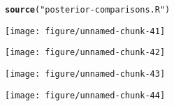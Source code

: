 \documentclass[12pt]{article}\usepackage[]{graphicx}\usepackage[]{color}
\makeatletter
\def\maxwidth{ %
  \ifdim\Gin@nat@width>\linewidth
    \linewidth
  \else
    \Gin@nat@width
  \fi
}
\newcommand{\hlstr}[1]{\textcolor[rgb]{0.192,0.494,0.8}{#1}}%
\newcommand{\hlstd}[1]{\textcolor[rgb]{0.345,0.345,0.345}{#1}}%
\newcommand{\hlkwd}[1]{\textcolor[rgb]{0.737,0.353,0.396}{\textbf{#1}}}%
\newenvironment{kframe}{%
 \def\at@end@of@kframe{}%
 \ifinner\ifhmode%
  \def\at@end@of@kframe{\end{minipage}}%
  \begin{minipage}{\columnwidth}%
 \fi\fi%
 \def\FrameCommand##1{\hskip\@totalleftmargin \hskip-\fboxsep
 \colorbox{shadecolor}{##1}\hskip-\fboxsep
     \hskip-\linewidth \hskip-\@totalleftmargin \hskip\columnwidth}%
 \MakeFramed {\advance\hsize-\width
   \@totalleftmargin\z@ \linewidth\hsize
   \@setminipage}}%
 {\par\unskip\endMakeFramed%
 \at@end@of@kframe}
\newenvironment{knitrout}{}{} %
\makeatother
\begin{document}
\begin{knitrout}
\color{fgcolor}\begin{kframe}
\begin{alltt}
\hlkwd{source}\hlstd{(}\hlstr{"posterior-comparisons.R"}\hlstd{)}
\end{alltt}


{\ttfamily\noindent\itshape\color{messagecolor}{\#\# Loading required package: ggplot2}}\end{kframe}
\texttt{[image: figure/unnamed-chunk-41]} 

\texttt{[image: figure/unnamed-chunk-42]} 

\texttt{[image: figure/unnamed-chunk-43]} 

\texttt{[image: figure/unnamed-chunk-44]} 

\end{knitrout}
\end{document}
